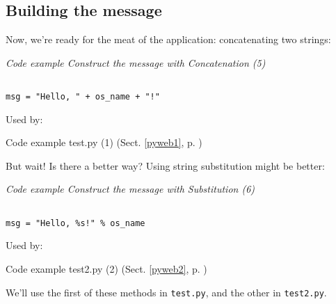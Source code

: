 \documentclass{article}
\begin{document}
\subsection{Building the message}

Now, we're ready for the meat of the application: concatenating two strings:

\label{pyweb5}
    \begin{flushleft}
    \textit{Code example Construct the message with Concatenation (5)}
    \begin{Verbatim}[commandchars=\\\{\},codes={\catcode`$=3\catcode`^=7},frame=single]

msg = "Hello, " + os_name + "!"

    \end{Verbatim}
    
    \footnotesize
    Used by:
    \begin{list}{}{}
    
    \item Code example test.py (1) (Sect. \ref{pyweb1}, p. \pageref{pyweb1})

    \end{list}
    \normalsize
    
    \end{flushleft}


But wait!  Is there a better way?  Using string substitution might be
better:

\label{pyweb6}
    \begin{flushleft}
    \textit{Code example Construct the message with Substitution (6)}
    \begin{Verbatim}[commandchars=\\\{\},codes={\catcode`$=3\catcode`^=7},frame=single]

msg = "Hello, %s!" % os_name

    \end{Verbatim}
    
    \footnotesize
    Used by:
    \begin{list}{}{}
    
    \item Code example test2.py (2) (Sect. \ref{pyweb2}, p. \pageref{pyweb2})

    \end{list}
    \normalsize
    
    \end{flushleft}


We'll use the first of these methods in \texttt{test.py}, and the
other in \texttt{test2.py}.
\end{document}
